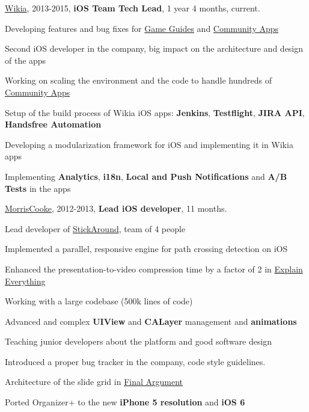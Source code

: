 \documentclass[letterpaper]{article}
\renewenvironment{itemize}{
  \begin{list}{}{
    \setlength{\leftmargin}{1.5em}
  }
}{
  \end{list}
}
\begin{document}
\begin{itemize}
    \item \href{http://www.wikia.com}{Wikia}, 2013-2015, {\bf iOS Team Tech Lead}, 1 year 4 months, current.
        \begin{itemize}
            \item Developing features and bug fixes for \href{https://itunes.apple.com/us/app/wikia-game-guides-walkthroughs/id422467074?mt=8}{Game Guides} and \href{https://itunes.apple.com/us/artist/wikia-inc./id422467077}{Community Apps}
            \item Second iOS developer in the company, big impact on the architecture and design of the apps
            \item Working on scaling the environment and the code to handle hundreds of \href{https://itunes.apple.com/us/artist/wikia-inc./id422467077}{Community Apps}
            \item Setup of the build process of Wikia iOS apps: {\bf Jenkins}, {\bf Testflight}, {\bf JIRA API}, {\bf Handsfree Automation}
            \item Developing a modularization framework for iOS and implementing it in Wikia apps
            \item Implementing {\bf Analytics}, {\bf i18n}, {\bf Local and Push Notifications} and {\bf A/B Tests} in the apps
        \end{itemize}
    \item \href{http://www.morriscooke.com}{MorrisCooke}, 2012-2013, {\bf Lead iOS developer}, 11 months.
		\begin{itemize}
            \item Lead developer of \href{https://itunes.apple.com/us/app/stick-around-by-tony-vincent/id557949353?mt=8}{StickAround}, team of 4 people
            \item Implemented a parallel, responsive engine for path crossing detection on iOS
            \item Enhanced the presentation-to-video compression time by a factor of 2 in \href{https://itunes.apple.com/us/app/explain-everything/id431493086?mt=8}{Explain Everything}
            \item Working with a large codebase (500k lines of code)
            \item Advanced and complex {\bf UIView} and {\bf CALayer} management and {\bf animations}
            \item Teaching junior developers about the platform and good software design
            \item Introduced a proper bug tracker in the company, code style guidelines.
            \item Architecture of the slide grid in \href{https://itunes.apple.com/us/app/final-argument/id480232096?mt=8}{Final Argument}
            \item Ported Organizer+ to the new {\bf iPhone 5 resolution} and {\bf iOS 6}
		\end{itemize}


\end{itemize}
\end{document}
